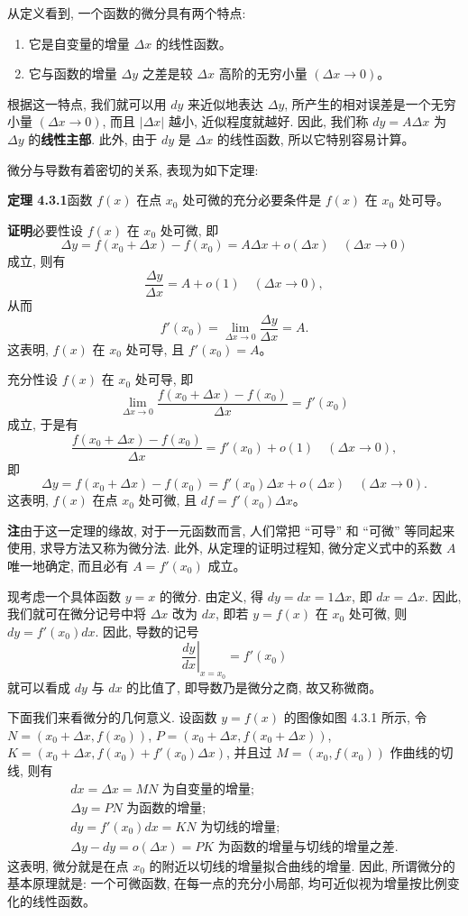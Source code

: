 \documentclass[UTF8,12pt,a4paper,fontset=fandol]{ctexart}
\begin{document}
从定义看到, 一个函数的微分具有两个特点:
\begin{enumerate}
  \item 它是自变量的增量 $\Delta x$ 的线性函数。
  \item 它与函数的增量 $\Delta y$ 之差是较 $\Delta x$ 高阶的无穷小量 $(\Delta x\to0)$。
\end{enumerate}
根据这一特点, 我们就可以用 $dy$ 来近似地表达 $\Delta y$, 所产生的相对误差是一个无穷小量 $(\Delta x\to0)$, 而且 $|\Delta x|$ 越小, 近似程度就越好. 因此, 我们称 $dy=A\Delta x$ 为 $\Delta y$ 的\textbf{线性主部}. 此外, 由于 $dy$ 是 $\Delta x$ 的线性函数, 所以它特别容易计算。

微分与导数有着密切的关系, 表现为如下定理:

\noindent\textbf{定理 4.3.1}\quad 函数 $f(x)$ 在点 $x_0$ 处可微的充分必要条件是 $f(x)$ 在 $x_0$ 处可导。

\noindent\textbf{证明}\quad 必要性\quad 设 $f(x)$ 在 $x_0$ 处可微, 即
\[
  \Delta y=f(x_0+\Delta x)-f(x_0)=A\Delta x+o(\Delta x)
  \quad(\Delta x\to0)
\]
成立, 则有
\[
  \frac{\Delta y}{\Delta x}
  =
  A+o(1)
  \quad(\Delta x\to0),
\]
从而
\[
  f'(x_0)
  =
  \lim_{\Delta x\to0}\frac{\Delta y}{\Delta x}
  =
  A.
\]
这表明, $f(x)$ 在 $x_0$ 处可导, 且 $f'(x_0)=A$。

充分性\quad 设 $f(x)$ 在 $x_0$ 处可导, 即
\[
  \lim_{\Delta x\to0}
  \frac{f(x_0+\Delta x)-f(x_0)}{\Delta x}
  =
  f'(x_0)
\]
成立, 于是有
\[
  \frac{f(x_0+\Delta x)-f(x_0)}{\Delta x}
  =
  f'(x_0)+o(1)
  \quad(\Delta x\to0),
\]
即
\[
  \Delta y=f(x_0+\Delta x)-f(x_0)
  =
  f'(x_0)\Delta x+o(\Delta x)
  \quad(\Delta x\to0).
\]
这表明, $f(x)$ 在点 $x_0$ 处可微, 且 $df=f'(x_0)\Delta x$。

\noindent\textbf{注}\quad 由于这一定理的缘故, 对于一元函数而言, 人们常把 ``可导'' 和 ``可微'' 等同起来使用, 求导方法又称为微分法. 此外, 从定理的证明过程知, 微分定义式中的系数 $A$ 唯一地确定, 而且必有 $A=f'(x_0)$ 成立。

现考虑一个具体函数 $y=x$ 的微分. 由定义, 得 $dy=dx=1\Delta x$, 即 $dx=\Delta x$. 因此, 我们就可在微分记号中将 $\Delta x$ 改为 $dx$, 即若 $y=f(x)$ 在 $x_0$ 处可微, 则 $dy=f'(x_0)dx$. 因此, 导数的记号
\[
  \left.\frac{dy}{dx}\right|_{x=x_0}=f'(x_0)
\]
就可以看成 $dy$ 与 $dx$ 的比值了, 即导数乃是微分之商, 故又称微商。

下面我们来看微分的几何意义. 设函数 $y=f(x)$ 的图像如图 4.3.1 所示, 令 $N=(x_0+\Delta x,f(x_0))$, $P=(x_0+\Delta x,f(x_0+\Delta x))$, $K=(x_0+\Delta x,f(x_0)+f'(x_0)\Delta x)$, 并且过 $M=(x_0,f(x_0))$ 作曲线的切线, 则有
\[
\begin{gathered}
  dx=\Delta x=MN\text{ 为自变量的增量;}\\
  \Delta y=PN\text{ 为函数的增量;}\\
  dy=f'(x_0)dx=KN\text{ 为切线的增量;}\\
  \Delta y-dy=o(\Delta x)=PK\text{ 为函数的增量与切线的增量之差.}
\end{gathered}
\]
这表明, 微分就是在点 $x_0$ 的附近以切线的增量拟合曲线的增量. 因此, 所谓微分的基本原理就是: 一个可微函数, 在每一点的充分小局部, 均可近似视为增量按比例变化的线性函数。
\end{document}
